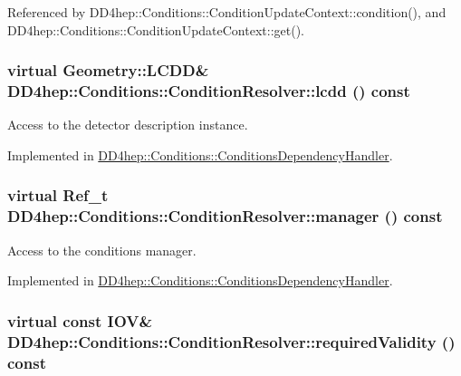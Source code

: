 Referenced by DD4hep::Conditions::ConditionUpdateContext::condition(), and DD4hep::Conditions::ConditionUpdateContext::get().\hypertarget{class_d_d4hep_1_1_conditions_1_1_condition_resolver_a9413afdddefecd04036fd7f7b8356fca}{
\subsubsection[{lcdd}]{\setlength{\rightskip}{0pt plus 5cm}virtual {\bf Geometry::LCDD}\& DD4hep::Conditions::ConditionResolver::lcdd () const}}
\label{class_d_d4hep_1_1_conditions_1_1_condition_resolver_a9413afdddefecd04036fd7f7b8356fca}


Access to the detector description instance. 

Implemented in \hyperlink{class_d_d4hep_1_1_conditions_1_1_conditions_dependency_handler_afef4a9e239622497629139c66a6ab7df}{DD4hep::Conditions::ConditionsDependencyHandler}.\hypertarget{class_d_d4hep_1_1_conditions_1_1_condition_resolver_ab8c95a13c7c20b35ab746e6fcc8c420f}{
\subsubsection[{manager}]{\setlength{\rightskip}{0pt plus 5cm}virtual {\bf Ref\_\-t} DD4hep::Conditions::ConditionResolver::manager () const}}
\label{class_d_d4hep_1_1_conditions_1_1_condition_resolver_ab8c95a13c7c20b35ab746e6fcc8c420f}


Access to the conditions manager. 

Implemented in \hyperlink{class_d_d4hep_1_1_conditions_1_1_conditions_dependency_handler_a2dde95f51874115f7a3c2ae055c7718b}{DD4hep::Conditions::ConditionsDependencyHandler}.\hypertarget{class_d_d4hep_1_1_conditions_1_1_condition_resolver_a96b82698fa08d7b1ecb46cd36f5e543f}{
\subsubsection[{requiredValidity}]{\setlength{\rightskip}{0pt plus 5cm}virtual const {\bf IOV}\& DD4hep::Conditions::ConditionResolver::requiredValidity () const}}
\label{class_d_d4hep_1_1_conditions_1_1_condition_resolver_a96b82698fa08d7b1ecb46cd36f5e543f}


